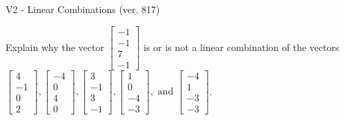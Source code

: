 \begin{exercise}
  \begin{exerciseTitle}V2 - Linear Combinations (ver. 817)\end{exerciseTitle}
  \begin{exerciseStatement}
    Explain why the vector \(\left[\begin{array}{c}
-1 \\
-1 \\
7 \\
-1
\end{array}\right]\)  is or is not a linear 
	combination of the vectors \(\left[\begin{array}{c}
4 \\
-1 \\
0 \\
2
\end{array}\right] , \left[\begin{array}{c}
-4 \\
0 \\
4 \\
0
\end{array}\right] , \left[\begin{array}{c}
3 \\
-1 \\
3 \\
-1
\end{array}\right] , \left[\begin{array}{c}
1 \\
0 \\
-4 \\
-3
\end{array}\right] , \text{ and } \left[\begin{array}{c}
-4 \\
1 \\
-3 \\
-3
\end{array}\right]\).
	



\end{exerciseStatement}
\end{exercise}

